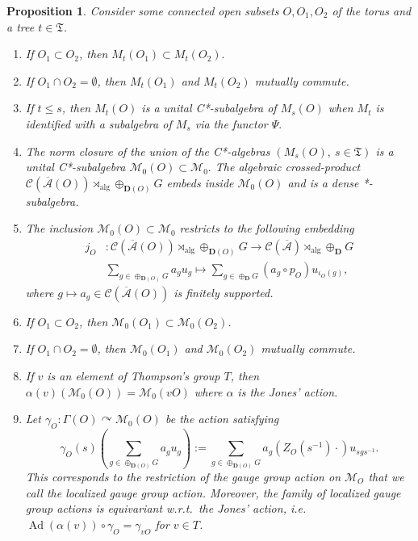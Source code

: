 \documentclass[a4paper,12pt]{amsart}
\numberwithin{equation}{section}
\newtheorem{proposition}[theo]{Proposition}
\theoremstyle{definition}
\newcommand{\act}{\curvearrowright}
\newcommand{\al}{\alpha}
\newcommand{\oscrA}{{\overline{\mathscr{A}}}}
\DeclareMathOperator{\Ad}{Ad}
\DeclareMathOperator{\alg}{alg}
\newcommand{\scrC}{\mathscr C}
\newcommand{\D}{\mathbf D}
\newcommand{\ga}{\gamma}
\newcommand{\Ga}{\Gamma}
\newcommand{\scrM}{\mathscr M}
\newcommand{\fT}{\mathfrak T}
\begin{document}
\begin{proposition}\label{prop:observables}
Consider some connected open subsets $O,O_1,O_2$ of the torus and a tree $t\in \fT$.
\begin{enumerate}
\item If $O_1\subset O_2$, then $M_t(O_1)\subset M_t(O_2).$
\item If $O_1\cap O_2 = \emptyset$, then $M_t(O_1)$ and $M_t(O_2)$ mutually commute.
\item If $t\leq s$, then $M_t(O)$ is a unital C*-subalgebra of $M_s(O)$ when $M_t$ is identified with a subalgebra of $M_s$ via the functor $\Psi.$
\item The norm closure of the union of the C*-algebras $(M_s(O),\ s\in \fT)$ is a unital C*-subalgebra $\scrM_0(O)\subset \scrM_0.$
The algebraic crossed-product $\scrC(\oscrA(O))\rtimes_{\alg} \oplus_{\D(O)} G$ embeds inside $\scrM_0(O)$ and is a dense *-subalgebra.
\item The inclusion $\scrM_0(O)\subset \scrM_0$ restricts to the following embedding
\begin{align*}
j_O & : \scrC(\oscrA(O))\rtimes_{\alg} \oplus_{\D(O)} G\to \scrC(\oscrA)\rtimes_{\alg} \oplus_\D G\\
& \sum_{g\in \oplus_{\D(O)} G} a_g u_g\mapsto \sum_{g\in \oplus_\D G} (a_g\circ p_O) u_{\iota_O(g)},
\end{align*}
where $g\mapsto a_g\in\scrC(\oscrA(O))$ is finitely supported.
\item If $O_1\subset O_2$, then $\scrM_{0}(O_1)\subset\scrM_{0}(O_2)$.
\item If $O_1\cap O_2 = \emptyset$, then $\scrM_{0}(O_1)$ and $\scrM_{0}(O_2)$ mutually commute.
\item If $v$ is an element of Thompson's group $T$, then $\al(v)(\scrM_0(O)) = \scrM_0(vO)$ where $\al$ is the Jones' action.
\item Let $\ga_O:\Ga(O) \act \scrM_0(O)$ be the action satisfying
$$\ga_O(s)\left(\sum_{g\in \oplus_{\D(O)} G} a_g u_g \right) :=  \sum_{g\in \oplus_{\D( O)} G} a_g(Z_O(s ^{-1} )\cdot ) u_{sgs^{-1}}.$$
This corresponds to the restriction of the gauge group action on $\scrM_O$ that we call the localized gauge group action.
Moreover, the family of localized gauge group actions is equivariant w.r.t.~the Jones' action, i.e.~$\Ad(\alpha(v)) \circ \ga_O = \ga_{vO}$ for $v\in T$.
\end{enumerate}
\end{proposition}
\end{document}
